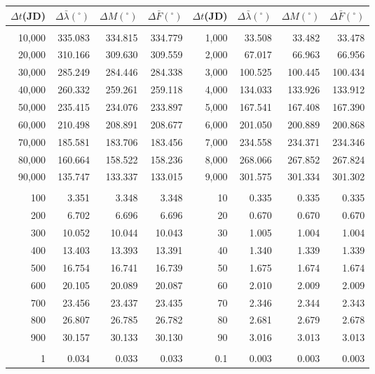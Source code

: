 \newpage
\begin{table}
\centering
\begin{tabular}{rrrr|rrrr}
$\Delta t$(JD)& $\Delta\bar{\lambda}(^\circ)$ &  $\Delta M(^\circ)$ & $\Delta \bar{F}(^\circ)$& $\Delta t$(JD) & $\Delta\bar{\lambda}(^\circ)$ & $\Delta M(^\circ)$ 
&$\Delta \bar{F}(^\circ)$\\ \hline
&&&&&&&\\[-1.75ex]
10,000 & 335.083 & 334.815 & 334.779 & 1,000 &  33.508 &  33.482 &  33.478\\
20,000 & 310.166 & 309.630 & 309.559 & 2,000 &  67.017 &  66.963 &  66.956\\
30,000 & 285.249 & 284.446 & 284.338 & 3,000 & 100.525 & 100.445 & 100.434\\
40,000 & 260.332 & 259.261 & 259.118 & 4,000 & 134.033 & 133.926 & 133.912\\
50,000 & 235.415 & 234.076 & 233.897 & 5,000 & 167.541 & 167.408 & 167.390\\
60,000 & 210.498 & 208.891 & 208.677 & 6,000 & 201.050 & 200.889 & 200.868\\
70,000 & 185.581 & 183.706 & 183.456 & 7,000 & 234.558 & 234.371 & 234.346\\
80,000 & 160.664 & 158.522 & 158.236 & 8,000 & 268.066 & 267.852 & 267.824\\
90,000 & 135.747 & 133.337 & 133.015 & 9,000 & 301.575 & 301.334 & 301.302\\
&&&&&&&\\
100 &   3.351 &   3.348 &   3.348 & 10 &   0.335 &   0.335 &   0.335\\
200 &   6.702 &   6.696 &   6.696 & 20 &   0.670 &   0.670 &   0.670\\
300 &  10.052 &  10.044 &  10.043 & 30 &   1.005 &   1.004 &   1.004\\
400 &  13.403 &  13.393 &  13.391 & 40 &   1.340 &   1.339 &   1.339\\
500 &  16.754 &  16.741 &  16.739 & 50 &   1.675 &   1.674 &   1.674\\
600 &  20.105 &  20.089 &  20.087 & 60 &   2.010 &   2.009 &   2.009\\
700 &  23.456 &  23.437 &  23.435 & 70 &   2.346 &   2.344 &   2.343\\
800 &  26.807 &  26.785 &  26.782 & 80 &   2.681 &   2.679 &   2.678\\
900 &  30.157 &  30.133 &  30.130 & 90 &   3.016 &   3.013 &   3.013\\
&&&&&&&\\
1 &   0.034 &   0.033 &   0.033 & 0.1 &   0.003 &   0.003 &   0.003\\

\end{tabular}
\end{table}
